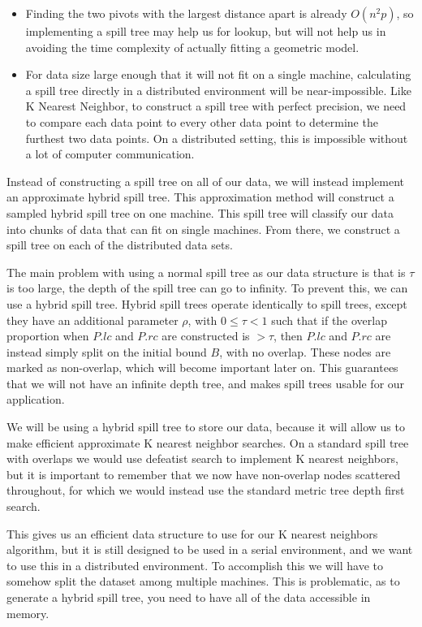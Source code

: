 \begin{itemize}
\item Finding the two pivots with the largest distance apart is already 
$O(n^{2} p)$, so implementing a spill tree may help us for lookup, but will not 
help us in avoiding the time complexity of actually fitting a geometric model.
\item For data size large enough that it will not fit on a single machine, 
calculating a spill tree directly in a distributed environment will be 
near-impossible. Like K Nearest Neighbor, to construct a spill tree with 
perfect precision, we need to compare each data point to every other data 
point to determine the furthest two data points. On a distributed setting, this 
is impossible without a lot of computer communication.
\end{itemize}

\vspace{5 mm}
\noindent
Instead of constructing a spill tree on all of our data, we will instead 
implement an approximate hybrid spill tree. This approximation method will 
construct a sampled hybrid spill tree on one machine. This spill tree will 
classify our data into chunks of data that can fit on single machines. From 
there, we construct a spill tree on each of the distributed data sets.

\vspace{5 mm}
\noindent
The main problem with using a normal spill tree as our data structure is that is
$\tau$ is too large, the depth of the spill tree can go to infinity.  To prevent
this, we can use a hybrid spill tree.  Hybrid spill trees operate identically to
spill trees, except they have an additional parameter $\rho$, with $0 \le \tau <
1$  such that if the overlap proportion when $P.lc$ and $P.rc$ are constructed
is  $> \tau$, then $P.lc$ and $P.rc$ are instead simply split on the initial
bound  $B$, with no overlap.  These nodes are marked as non-overlap, which will
become  important later on.  This guarantees that we will not have an infinite
depth  tree, and makes spill trees usable for our application.

\vspace{5 mm}
\noindent
We will be using a hybrid spill tree to store our data, because it will allow us
to make efficient approximate K nearest neighbor searches.  On a standard spill
tree with overlaps we would use defeatist search to implement K nearest
neighbors,  but it is important to remember that we now have non-overlap nodes
scattered  throughout, for which we would instead use the standard metric tree
depth first search.

\vspace{5 mm}
\noindent
This gives us an efficient data structure to use for our K nearest neighbors
algorithm, but it is still designed to be used in a serial environment, and we
want to use this in a distributed environment.  To accomplish this we will have
to somehow split the dataset among multiple machines.  This is problematic, as
to generate a hybrid spill tree, you need to have all of the data accessible in
memory.


